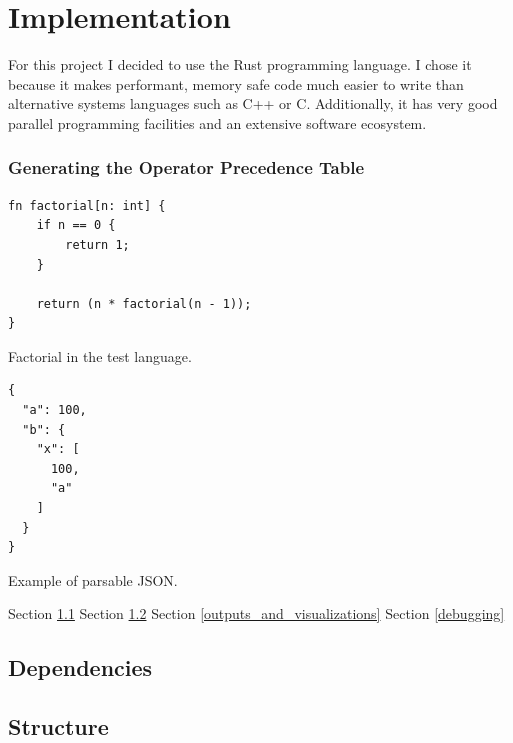 \chapter{Implementation} \label{implementation}

For this project I decided to use the Rust programming language. I chose
it because it makes performant, memory safe code much easier to write than
alternative systems languages such as C++ or C. Additionally, it has very good
parallel programming facilities and an extensive software ecosystem.

\subsection{Generating the Operator Precedence Table}

\begin{listing}[H]
\begin{verbatim}
fn factorial[n: int] {
    if n == 0 {
        return 1;
    } 

    return (n * factorial(n - 1));
}
\end{verbatim}
\caption{Factorial in the test language.}
\label{lst:factorial_example}
\end{listing}

\begin{listing}[H]
\begin{verbatim}
{
  "a": 100,
  "b": {
    "x": [
      100,
      "a"
    ]
  }
}
\end{verbatim}
\caption{Example of parsable JSON.}
\hrulefill
\label{lst:json_example}
\end{listing}

Section \ref{dependancies}
\newline \newline
Section \ref{structure}
\newline \newline
Section \ref{outputs_and_visualizations}
\newline \newline
Section \ref{debugging}

\section{Dependencies} \label{dependancies}
\section{Structure} \label{structure}
